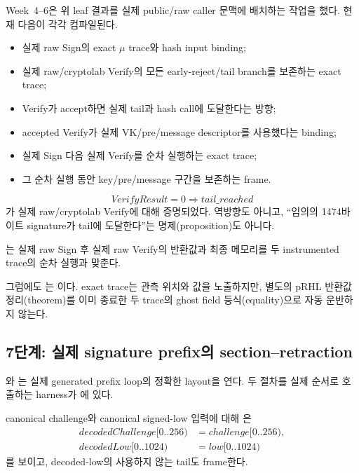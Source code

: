Week~4--6은 위 leaf 결과를 실제 public/raw caller 문맥에 배치하는 작업을 했다.
현재 다음이 각각 컴파일된다.

\begin{itemize}
  \item 실제 raw Sign의 exact \(\mu\) trace와 hash input binding;
  \item 실제 raw/cryptolab Verify의 모든 early-reject/tail branch를 보존하는
        exact trace;
  \item Verify가 accept하면 실제 tail과 hash call에 도달한다는 방향;
  \item accepted Verify가 실제 VK/pre/message descriptor를 사용했다는 binding;
  \item 실제 Sign 다음 실제 Verify를 순차 실행하는 exact trace;
  \item 그 순차 실행 동안 key/pre/message 구간을 보존하는 frame.
\end{itemize}

\begin{verified}
\[
  \mathit{VerifyResult}=0
  \Longrightarrow \mathit{tail\_reached}
\]
가 실제 raw/cryptolab Verify에 대해 증명되었다. 역방향도 아니고,
``임의의 1474바이트 signature가 tail에 도달한다''는 명제(proposition)도 아니다.
\end{verified}

\begin{verified}
는 실제 raw Sign 후 실제 raw
Verify의 반환값과 최종 메모리를 두 instrumented trace의 순차 실행과 맞춘다.
\end{verified}

그럼에도 는 \statuspartial 이다. exact trace는
관측 위치와 값을 노출하지만, 별도의 pRHL 반환값 정리(theorem)를 이미 종료한 두 trace의
ghost field 등식(equality)으로 자동 운반하지 않는다.

\subsection{7단계: 실제 signature prefix의 section--retraction}

와
는 실제 generated prefix loop의
정확한 layout을 연다. 두 절차를 실제 순서로 호출하는 harness가
에 있다.

\begin{verified}
canonical challenge와 canonical signed-low 입력에 대해
은
\begin{align*}
  \mathit{decodedChallenge}[0..256)&=\mathit{challenge}[0..256),\\
  \mathit{decodedLow}[0..1024)&=\mathit{low}[0..1024)
\end{align*}
를 보이고, decoded-low의 사용하지 않는 tail도 frame한다.
\end{verified}

